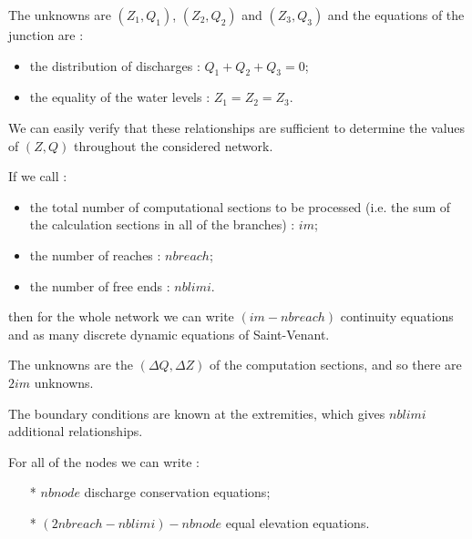 The unknowns are $(Z_1,Q_1)$, $(Z_2,Q_2)$ and $(Z_3,Q_3)$ and the equations of the junction are :
\begin{itemize}
 \item the distribution of discharges : $Q_1 + Q_2 + Q_3 = 0$;
 \item the equality of the water levels : $Z_1 = Z_2 = Z_3$.
\end{itemize}

\vspace{0.5cm}

We can easily verify that these relationships are sufficient to determine the values of $(Z,Q)$ throughout the considered network.

\vspace{0.5cm}

If we call :
\begin{itemize}
 \item the total number of computational sections to be processed (i.e. the sum of the calculation sections in all of the branches) : $im$;
 \item the number of reaches : $nbreach$;
 \item the number of free ends : $nblimi$.
\end{itemize}

\vspace{0.5cm}

then for the whole network we can write $(im-nbreach)$ continuity equations and as many discrete dynamic equations of Saint-Venant.

\vspace{0.5cm}

The unknowns are the $(\Delta Q,\Delta Z)$ of the computation sections, and so there are $2 im$ unknowns.

\vspace{0.5cm}

The boundary conditions are known at the extremities, which gives $nblimi$ additional relationships.

\vspace{0.5cm}

For all of the nodes we can write :
\begin{itemize}
 \item[*] $nbnode$ discharge conservation equations;
 \item[*] $(2nbreach-nblimi) - nbnode$ equal elevation equations.
\end{itemize}

\vspace{0.5cm}


